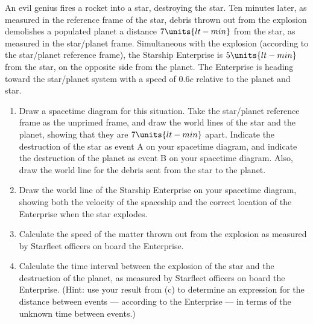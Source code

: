 \begin{problem}
An evil genius fires a rocket into a star, destroying the star.
Ten minutes later, as measured in the reference frame of the star,
debris thrown out from the explosion demolishes a
populated planet a distance $7\units{lt-min}$ from the star, as measured
in the star/planet frame.  Simultaneous with the explosion (according
to the star/planet reference frame), the Starship
Enterprise is $5\units{lt-min}$  from the star, on the opposite side from
the planet.  The Enterprise is
heading toward the star/planet system with a
speed of $0.6c$ relative to the planet and star.
\begin{enumerate}
     \item Draw a spacetime diagram for this situation.  Take the
       star/planet reference frame as the unprimed frame, and draw the
       world lines of the star and the planet, showing that they are
       $7\units{lt-min}$ apart.  Indicate the destruction of the star
       as event A on your spacetime diagram, and indicate the
       destruction of the planet as event B on your spacetime diagram.
       Also, draw the world line for the debris sent from the star to the
       planet.
     \item Draw the world line of the Starship Enterprise on your spacetime
     diagram, showing both the velocity of the spaceship and the correct
     location of the Enterprise when the star explodes.
    \item Calculate the speed of the matter thrown out from the explosion
     as measured by Starfleet officers on board the Enterprise.
     \item Calculate the time interval between the explosion of the star
     and the destruction of the planet, as measured by Starfleet officers
     on board the Enterprise.  (Hint:  use your result from (c) to
     determine an expression for the distance between events ---
     according to the Enterprise --- in terms of the unknown time between
     events.)
     \end{enumerate}
\label{prob:evil_genius}
\end{problem}
\newpage

